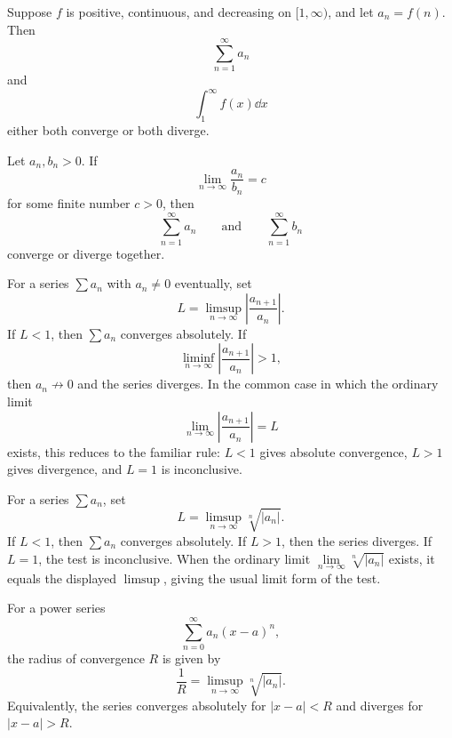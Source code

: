     \begin{theorem}
        Suppose $f$ is positive, continuous, and decreasing on $[1,\infty)$,
        and let $a_n=f(n)$. Then
        \[
            \sum_{n=1}^{\infty}a_n
        \]
        and
        \[
            \int_1^{\infty}f(x)\dd x
        \]
        either both converge or both diverge.
    \end{theorem}

    \begin{theorem}
        Let $a_n,b_n>0$. If
        \[
            \lim\limits_{n\to\infty}\frac{a_n}{b_n}=c
        \]
        for some finite number $c>0$, then
        \[
            \sum_{n=1}^{\infty}a_n
            \qquad\text{and}\qquad
            \sum_{n=1}^{\infty}b_n
        \]
        converge or diverge together.
    \end{theorem}

    \begin{theorem}
        For a series $\sum a_n$ with $a_n\neq0$ eventually, set
        \[
            L=\limsup_{n\to\infty}
            \left|\frac{a_{n+1}}{a_n}\right|.
        \]
        If $L<1$, then $\sum a_n$ converges absolutely. If
        \[
            \liminf_{n\to\infty}
            \left|\frac{a_{n+1}}{a_n}\right|>1,
        \]
        then $a_n\not\to0$ and the series diverges. In the common case in which
        the ordinary limit
        \[
            \lim\limits_{n\to\infty}
            \left|\frac{a_{n+1}}{a_n}\right|=L
        \]
        exists, this reduces to the familiar rule: $L<1$ gives absolute
        convergence, $L>1$ gives divergence, and $L=1$ is inconclusive.
    \end{theorem}

    \begin{theorem}
        For a series $\sum a_n$, set
        \[
            L=\limsup_{n\to\infty}\sqrt[n]{|a_n|}.
        \]
        If $L<1$, then $\sum a_n$ converges absolutely. If $L>1$, then the
        series diverges. If $L=1$, the test is inconclusive. When the ordinary
        limit $\lim\limits_{n\to\infty}\sqrt[n]{|a_n|}$ exists, it equals the
        displayed $\limsup$, giving the usual limit form of the test.
    \end{theorem}

    \begin{theorem}
        For a power series
        \[
            \sum_{n=0}^{\infty}a_n(x-a)^n,
        \]
        the radius of convergence $R$ is given by
        \[
            \frac{1}{R}
            =
            \limsup_{n\to\infty}\sqrt[n]{|a_n|}.
        \]
        Equivalently, the series converges absolutely for $|x-a|<R$ and
        diverges for $|x-a|>R$.
    \end{theorem}


